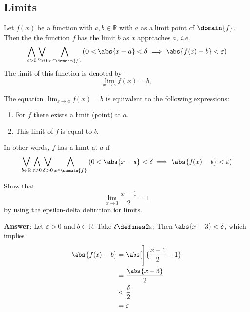 \subsection{Limits}\label{subsec-limits}

\begin{definition}\label{def-epsilon-delta-definition-limit}
    Let $f(x)$ be a function with $a,b\in\mathbb{R}$ with $a$ as a limit point of $\domain{f}$.
    Then the the function $f$ has the limit $b$ as $x$ approaches $a$, \textit{i.e.}    
    \begin{equation}
        \bigwedge_{\varepsilon>0}\bigvee_{\delta>0}\bigwedge_{x\in\domain{f}} 
        \left(0<\abs{x-a}<\delta\implies\abs{f(x)-b}<\varepsilon\right)
    \end{equation}
    The limit of this function is denoted by
    \begin{equation}
        \lim_{x\to a}f(x)=b,
    \end{equation}
\end{definition}

\begin{rem}
    The equation $\displaystyle\lim_{x\to a}f(x)=b$ is equivalent to the following
    expressions:
    \begin{enumerate}
        \item For $f$ there exists a limit (point) at $a$.
        \item This limit of $f$ is equal to $b$.
    \end{enumerate}
    In other words, $f$ has a limit at $a$ if
    \begin{equation*}
        \bigvee_{b\in\mathbb{R}}\bigwedge_{\varepsilon>0}\bigvee_{\delta>0}\bigwedge_{x\in\domain{f}} 
        \left(0<\abs{x-a}<\delta \implies \abs{f(x)-b}<\varepsilon\right)
    \end{equation*}
\end{rem}

\begin{exm}\label{exm-epsilon-delta-definition-limit:1}
    Show that 
    \begin{equation*}
        \lim_{x\to3}\frac{x-1}{2}=1
    \end{equation*}
    by using the epsilon-delta definition for limits.
    \begin{flushleft}
        \textbf{Answer}: Let $\varepsilon>0$ and $b\in\mathbb{R}$. Take 
        $\delta\defines2\varepsilon$; Then $\abs{x-3}<\delta$, which implies
        \begin{align*}
            \abs{f(x)-b}&=\abs[\Bigg]{\frac{x-1}{2}-1}\\
                        &=\frac{\abs{x-3}}{2}\\
                        &<\frac{\delta}{2}\\
                        &=\varepsilon
        \end{align*}
    \end{flushleft}
\end{exm}


